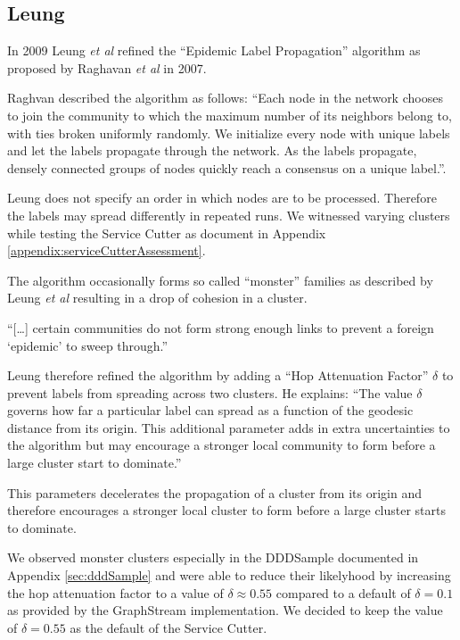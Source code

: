 \subsection{Leung}
\label{sec:monsterclusters}

In 2009 Leung \textit{et al}\cite{leung} refined the \enquote{Epidemic Label Propagation} algorithm as proposed by Raghavan \textit{et al}\cite{raghavan} in 2007. 

Raghvan described the algorithm as follows: \enquote{Each node in the network chooses to
join the community to which the maximum number of its neighbors belong to, with ties broken uniformly randomly. We initialize every node with unique labels and let the labels propagate through the network. As the labels propagate, densely connected groups of nodes quickly reach a consensus on a unique label.}\cite[p. 4]{raghavan}.

Leung does not specify an order in which nodes are to be processed. Therefore the labels may spread differently in repeated runs. We witnessed varying clusters while testing the Service Cutter as document in Appendix \ref{appendix:serviceCutterAssessment}.

The algorithm occasionally forms so called \enquote{monster} families as described by Leung \textit{et al} resulting in a drop of cohesion in a cluster. 

\enquote{[\dots] certain communities do not form strong enough links to prevent a foreign \enquote{epidemic} to sweep through.}\cite[p. 5]{leung}

Leung therefore refined the algorithm by adding a \enquote{Hop Attenuation Factor} $\delta$ to prevent labels from spreading across two clusters. He explains: \enquote{The value $\delta$ governs how far a particular label can spread as a function of the geodesic distance from its origin. This additional parameter adds in extra uncertainties
to the algorithm but may encourage a stronger local community to form before a large cluster start to dominate.}

This parameters decelerates the propagation of a cluster from its origin and therefore encourages a stronger local cluster to form before a large cluster starts to dominate.

We observed monster clusters especially in the DDDSample documented in Appendix \ref{sec:dddSample} and were able to reduce their likelyhood by increasing the hop attenuation factor to a value of $\delta \approx 0.55$ compared to a default of $ \delta = 0.1$ as provided by the GraphStream implementation. We decided to keep the value of $\delta = 0.55$ as the default of the Service Cutter.

